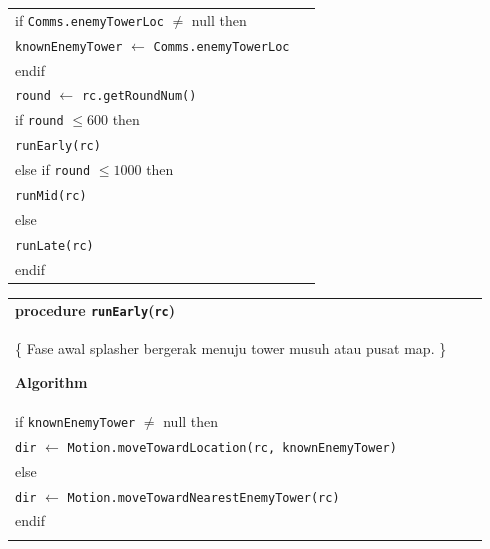 \documentclass{article}
\newenvironment{pseudobox}
{
\centering
\begin{longtable}{|p{0.94\linewidth}|}
\hline
}
{
\\ \hline
\end{longtable}
\vspace{0.05cm}
}
\begin{document}
\begin{enumerate}[label=\alph*.]
\begin{pseudobox}
\hspace*{1.5em}if \texttt{Comms.enemyTowerLoc} $\neq$ null then \\
\hspace*{3em}\texttt{knownEnemyTower} $\leftarrow$ \texttt{Comms.enemyTowerLoc} \\
\hspace*{1.5em}endif \\

\hspace*{1.5em}\texttt{round} $\leftarrow$ \texttt{rc.getRoundNum()} \\

\hspace*{1.5em}if \texttt{round} $\leq 600$ then \\
\hspace*{3em}\texttt{runEarly(rc)} \\

\hspace*{1.5em}else if \texttt{round} $\leq 1000$ then \\
\hspace*{3em}\texttt{runMid(rc)} \\

\hspace*{1.5em}else \\
\hspace*{3em}\texttt{runLate(rc)} \\
\hspace*{1.5em}endif

\end{pseudobox}
\begin{pseudobox}
\textbf{procedure \texttt{runEarly}(\texttt{rc})} \\
\{ Fase awal splasher bergerak menuju tower musuh atau pusat map. \}

\textbf{Algorithm} \\

\hspace*{1.5em}if \texttt{knownEnemyTower} $\neq$ null then \\
\hspace*{3em}\texttt{dir} $\leftarrow$ \texttt{Motion.moveTowardLocation(rc, knownEnemyTower)} \\
\hspace*{1.5em}else \\
\hspace*{3em}\texttt{dir} $\leftarrow$ \texttt{Motion.moveTowardNearestEnemyTower(rc)} \\
\hspace*{1.5em}endif \\


\end{pseudobox}
\end{enumerate}
\end{document}
